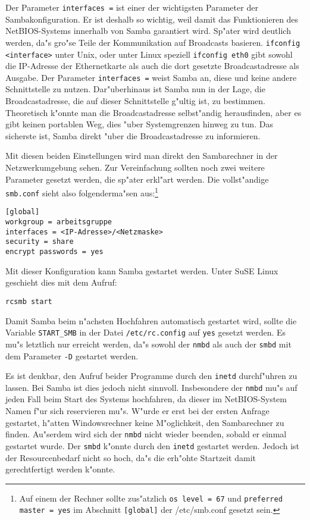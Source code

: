 \documentclass{scrartcl}
\newcommand{\prog}{\texttt}
\newcommand{\param}{\texttt}
\newcommand{\datei}{\texttt}
\begin{document}
Der Parameter \label{interfaces}\param{interfaces =} ist einer der
wichtigsten Parameter der Sambakonfiguration. Er ist deshalb so
wichtig, weil damit das Funktionieren des NetBIOS-Systems innerhalb
von Samba garantiert wird.  Sp"ater wird deutlich werden, da"s gro"se
Teile der Kommunikation auf Broadcasts basieren. \prog{ifconfig
  <interface>} unter Unix, oder unter Linux speziell \prog{ifconfig
  eth0} gibt sowohl die IP-Adresse der Ethernetkarte als auch die dort
gesetzte Broadcastadresse als Ausgabe. Der Parameter \param{interfaces
  =} weist Samba an, diese und keine andere Schnittstelle zu nutzen.
Dar"uberhinaus ist Samba nun in der Lage, die Broadcastadresse, die
auf dieser Schnittstelle g"ultig ist, zu bestimmen. Theoretisch
k"onnte man die Broadcastadresse selbst"andig herausfinden, aber es
gibt keinen portablen Weg, dies "uber Systemgrenzen hinweg zu tun. Das
sicherste ist, Samba direkt "uber die Broadcastadresse zu informieren.

Mit diesen beiden Einstellungen wird man direkt den Sambarechner in
der Netzwerkumgebung sehen. Zur Vereinfachung sollten noch zwei
weitere Parameter gesetzt werden, die sp"ater erkl"art werden. Die
vollst"andige \datei{smb.conf} sieht also folgenderma"sen
aus:\footnote{Auf einem der Rechner sollte zus"atzlich \param{os level
    = 67} und \param{preferred master = yes} im Abschnitt 
    \param{[global]} der /etc/smb.conf gesetzt sein.}

\begin{verbatim}
[global]
workgroup = arbeitsgruppe
interfaces = <IP-Adresse>/<Netzmaske>
security = share
encrypt passwords = yes
\end{verbatim}

Mit dieser Konfiguration kann Samba gestartet werden. Unter SuSE Linux
geschieht dies mit dem Aufruf:

\begin{verbatim}
rcsmb start
\end{verbatim}

Damit Samba beim n"achsten Hochfahren automatisch gestartet wird,
sollte die Variable \texttt{START\_SMB} in der Datei
\datei{/etc/rc.config} auf \texttt{yes} gesetzt werden. Es mu"s
letztlich nur erreicht werden, da"s sowohl der \prog{nmbd} als auch
der \prog{smbd} mit dem Parameter \texttt{-D} gestartet werden.

Es ist denkbar, den Aufruf beider Programme durch den \prog{inetd}
durchf"uhren zu lassen. Bei Samba ist dies jedoch nicht sinnvoll.
Insbesondere der \prog{nmbd} mu"s auf jeden Fall beim Start des
Systems hochfahren, da dieser im NetBIOS-System Namen f"ur sich
reservieren mu"s. W"urde er erst bei der ersten Anfrage gestartet,
h"atten Windowsrechner keine M"oglichkeit, den Sambarechner zu finden.
Au"serdem wird sich der \prog{nmbd} nicht wieder beenden, sobald er
einmal gestartet wurde. Der \prog{smbd} k"onnte durch den \prog{inetd}
gestartet werden. Jedoch ist der Resourcenbedarf nicht so hoch, da"s
die erh"ohte Startzeit damit gerechtfertigt werden k"onnte.
\end{document}
